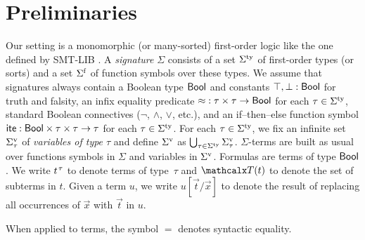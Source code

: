 
\section{Preliminaries}
\label{sec:prelim}

Our setting is a monomorphic (or many-sorted) first-order logic
like the one defined by SMT-LIB \cite{smtlib25}.
A \emph{signature} $\Sigma$ consists of
a set $\stypes{\Sigma}$ of %
first-order types
%
(or sorts) and a set $\sfuns{\Sigma}$ of function symbols over these types.
We assume that signatures always contain a Boolean type $\mathsf{Bool}$ and constants
$\top, \bot : \mathsf{Bool}$ for truth and falsity,
an infix equality predicate ${\approx} : \tau \times \tau \to \mathsf{Bool}$
for each $\tau \in \stypes{\Sigma}$,
standard Boolean connectives ($\neg$, $\wedge$, $\vee$, etc.),
and an if--then--else function symbol
$\mathsf{ite} : \mathsf{Bool} \times \tau \times \tau \rightarrow \tau$
for each $\tau \in \stypes{\Sigma}$.
%
For each $\tau \in \stypes{\Sigma}$,
we fix an infinite set $\svars{\Sigma}_\tau$ of \emph{variables of type $\tau$} and
define $\svars{\Sigma}$ as $\bigcup_{\tau \in \stypes{\Sigma}} \svars{\Sigma}_\tau$.
$\Sigma$-terms are built as usual over functions symbols in $\Sigma$ and variables in $\svars{\Sigma}$.
%
Formulas are terms of type $\mathsf{Bool}$.
We write $t\typ{\tau}$ to denote %
terms of type~$\tau$ and $\terms( t )$ to denote the set of subterms in $t$.
Given a term $u$, we write $u[\vec t/\vec x]$ to denote the result of replacing
all occurrences of $\vec x$ with $\vec t$ in $u$.
\begin{longv}When applied to terms, the symbol $=$ denotes syntactic equality.\end{longv}


